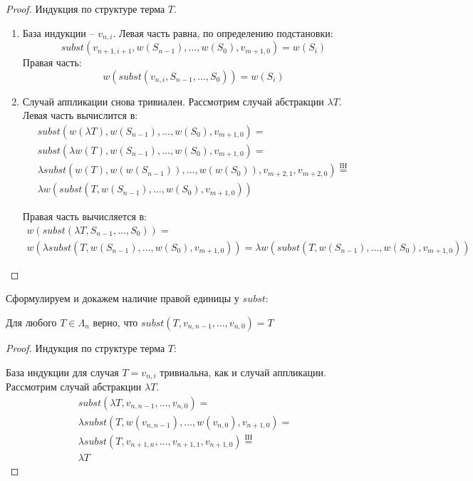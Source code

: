 \begin{proof}
  Индукция по структуре терма $T$.
  \begin{enumerate}
    \item База индукции -- $v_{n, i}$. Левая часть равна, по определению подстановки:
    $$ subst(v_{n+1, i+1}, w(S_{n-1}), \dots, w(S_{0}), v_{m+1, 0}) = w(S_{i})$$
    Правая часть:
    $$w(subst(v_{n,i}, S_{n-1}, \dots, S_{0})) = w(S_{i})$$

    \item Случай аппликации снова тривиален. Рассмотрим случай абстракции $\lambda T$. Левая часть вычислится в:
    \begin{gather*}
        subst(w(\lambda T), w(S_{n-1}), \dots, w(S_{0}), v_{m+1, 0}) = \\
        subst(\lambda w(T), w(S_{n-1}), \dots, w(S_{0}), v_{m+1, 0}) = \\
        \lambda subst(w(T), w(w(S_{n-1})), \dots, w(w(S_{0})), v_{m+2, 1}, v_{m+2,0}) \overset{\mathrm{IH}}{=} \\
        \lambda w(subst(T, w(S_{n-1}), \dots, w(S_{0}), v_{m+1, 0}))
    \end{gather*}

    Правая часть вычисляется в:
    \begin{gather*}
        w(subst(\lambda T, S_{n-1}, \dots, S_{0})) = \\
        w(\lambda subst(T, w(S_{n-1}), \dots, w(S_{0}), v_{m+1, 0})) =
        \lambda w(subst(T, w(S_{n-1}), \dots, w(S_{0}), v_{m+1, 0}))
    \end{gather*}
  \end{enumerate}
\end{proof}

Сформулируем и докажем наличие правой единицы у $subst$:
\begin{prop}
  Для любого $T \in \Lambda_{n}$ верно, что $subst(T, v_{n, n-1}, \dots, v_{n,0}) = T$
\end{prop}

\begin{proof}
  Индукция по структуре терма $T$:

  База индукции для случая $T = v_{n,i}$ тривиальна, как и случай аппликации. Рассмотрим случай абстракции $\lambda T$.
  \begin{gather*}
      subst(\lambda T, v_{n, n-1}, \dots, v_{n, 0}) = \\
      \lambda subst(T, w(v_{n, n-1}), \dots, w(v_{n,0}), v_{n+1, 0}) = \\
      \lambda subst(T, v_{n+1, n}, \dots, v_{n + 1,1}, v_{n+1, 0}) \overset{\mathrm{IH}}{=} \\
      \lambda T
  \end{gather*}
\end{proof}

